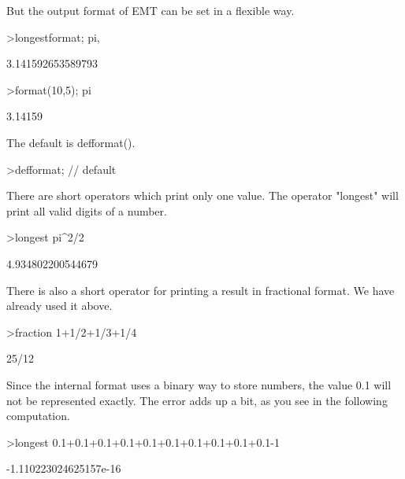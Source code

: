 \documentclass{article}
\begin{document}
\begin{eulernotebook}
\begin{eulercomment}
But the output format of EMT can be set in a flexible way.
\end{eulercomment}
\begin{eulerprompt}
>longestformat; pi,
\end{eulerprompt}
\begin{euleroutput}
  3.141592653589793
\end{euleroutput}
\begin{eulerprompt}
>format(10,5); pi
\end{eulerprompt}
\begin{euleroutput}
    3.14159 
\end{euleroutput}
\begin{eulercomment}
The default is defformat().
\end{eulercomment}
\begin{eulerprompt}
>defformat; // default
\end{eulerprompt}
\begin{eulercomment}
There are short operators which print only one value. The operator "longest"
will print all valid digits of a number.
\end{eulercomment}
\begin{eulerprompt}
>longest pi^2/2
\end{eulerprompt}
\begin{euleroutput}
        4.934802200544679 
\end{euleroutput}
\begin{eulercomment}
There is also a short operator for printing a result in fractional format. We
have already used it above.
\end{eulercomment}
\begin{eulerprompt}
>fraction 1+1/2+1/3+1/4
\end{eulerprompt}
\begin{euleroutput}
  25/12
\end{euleroutput}
\begin{eulercomment}
Since the internal format uses a binary way to store numbers, the value 0.1
will not be represented exactly. The error adds up a bit, as you see in the
following computation.
\end{eulercomment}
\begin{eulerprompt}
>longest 0.1+0.1+0.1+0.1+0.1+0.1+0.1+0.1+0.1+0.1-1
\end{eulerprompt}
\begin{euleroutput}
   -1.110223024625157e-16 
\end{euleroutput}
\begin{eulercomment}

\end{eulercomment}
\end{eulernotebook}
\end{document}
